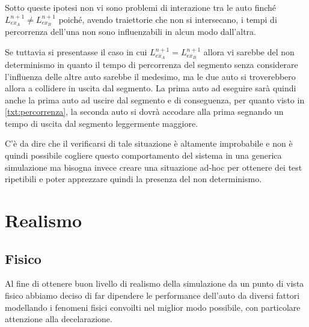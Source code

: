 \documentclass[11pt,a4paper]{report}
\begin{document}
Sotto queste ipotesi non vi sono problemi di interazione tra le auto finché $L_{ex_A}^{n+1} \neq L_{ex_B}^{n+1}$ poiché, avendo traiettorie che non si intersecano, i tempi di percorrenza dell'una non sono influenzabili in alcun modo dall'altra.

Se tuttavia si presentasse il caso in cui $L_{ex_A}^{n+1} = L_{ex_B}^{n+1}$ allora vi sarebbe del non determinismo in quanto il tempo di percorrenza del segmento senza considerare l'influenza delle altre auto sarebbe il medesimo, ma le due auto si troverebbero allora a collidere in uscita dal segmento. La prima auto ad eseguire sarà quindi anche la prima auto ad uscire dal segmento e di conseguenza, per quanto visto in \ref{txt:percorrenza}, la seconda auto si dovrà accodare alla prima segnando un tempo di uscita dal segmento leggermente maggiore.

C'è da dire che il verificarsi di tale situazione è altamente improbabile e non è quindi possibile cogliere questo comportamento del sistema in una generica simulazione ma bisogna invece creare una situazione ad-hoc per ottenere dei test ripetibili e poter apprezzare quindi la presenza del non determinismo.

\section{Realismo}
\subsection*{Fisico}
Al fine di ottenere buon livello di realismo della simulazione da un punto di vista fisico abbiamo deciso di far dipendere le performance dell'auto da diversi fattori modellando i fenomeni fisici convoilti nel miglior modo possibile, con particolare attenzione alla decelarazione.
\end{document}
